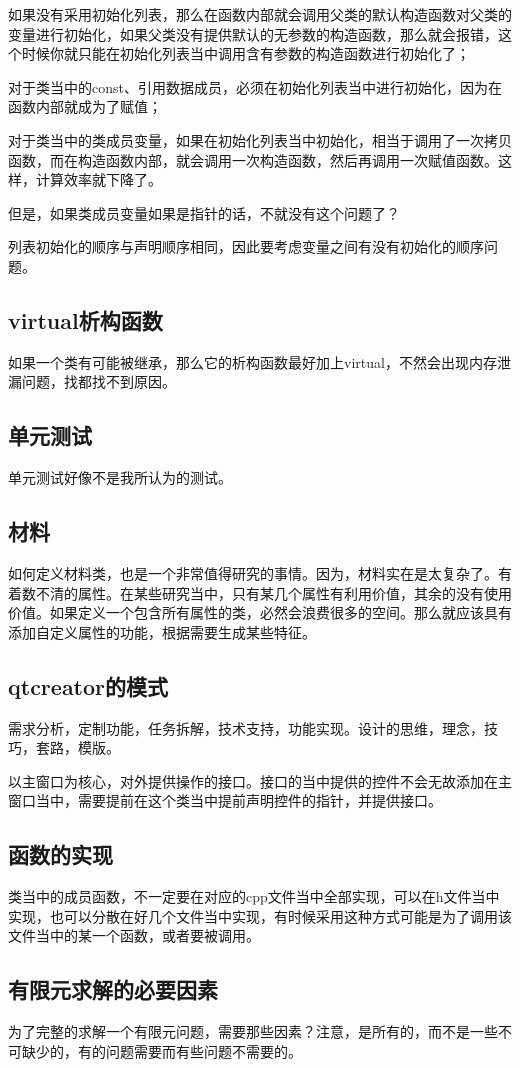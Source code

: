 如果没有采用初始化列表，那么在函数内部就会调用父类的默认构造函数对父类的变量进行初始化，如果父类没有提供默认的无参数的构造函数，那么就会报错，这个时候你就只能在初始化列表当中调用含有参数的构造函数进行初始化了；

对于类当中的const、引用数据成员，必须在初始化列表当中进行初始化，因为在函数内部就成为了赋值；

对于类当中的类成员变量，如果在初始化列表当中初始化，相当于调用了一次拷贝函数，而在构造函数内部，就会调用一次构造函数，然后再调用一次赋值函数。这样，计算效率就下降了。

但是，如果类成员变量如果是指针的话，不就没有这个问题了？

列表初始化的顺序与声明顺序相同，因此要考虑变量之间有没有初始化的顺序问题。
\subsection{virtual析构函数}
如果一个类有可能被继承，那么它的析构函数最好加上virtual，不然会出现内存泄漏问题，找都找不到原因。
\subsection{单元测试}
单元测试好像不是我所认为的测试。
\subsection{材料}
如何定义材料类，也是一个非常值得研究的事情。因为，材料实在是太复杂了。有着数不清的属性。在某些研究当中，只有某几个属性有利用价值，其余的没有使用价值。如果定义一个包含所有属性的类，必然会浪费很多的空间。那么就应该具有添加自定义属性的功能，根据需要生成某些特征。
\subsection{qtcreator的模式}
需求分析，定制功能，任务拆解，技术支持，功能实现。设计的思维，理念，技巧，套路，模版。

以主窗口为核心，对外提供操作的接口。接口的当中提供的控件不会无故添加在主窗口当中，需要提前在这个类当中提前声明控件的指针，并提供接口。
\subsection{函数的实现}
类当中的成员函数，不一定要在对应的cpp文件当中全部实现，可以在h文件当中实现，也可以分散在好几个文件当中实现，有时候采用这种方式可能是为了调用该文件当中的某一个函数，或者要被调用。
\subsection{有限元求解的必要因素}
为了完整的求解一个有限元问题，需要那些因素？注意，是所有的，而不是一些不可缺少的，有的问题需要而有些问题不需要的。
